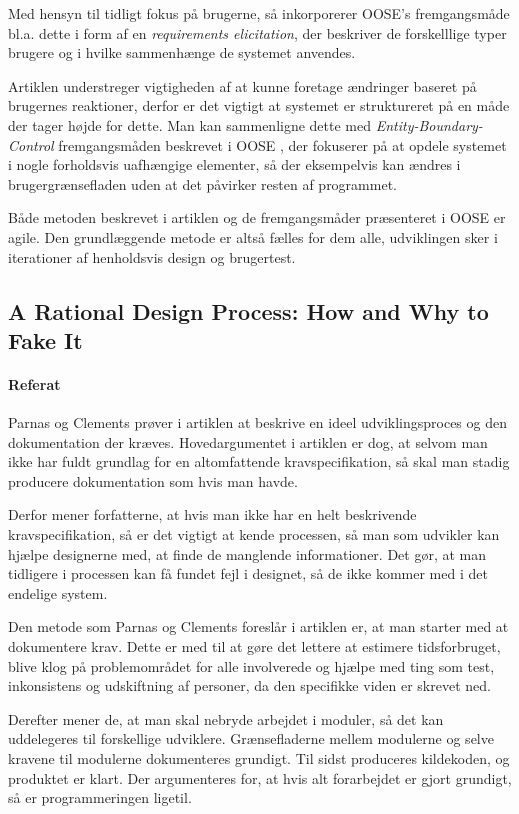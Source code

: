 \documentclass[11pt, a4paper]{article}
\begin{document}
Med hensyn til tidligt fokus på brugerne, så inkorporerer OOSE's fremgangsmåde bl.a. dette i form af en \emph{requirements elicitation}, der beskriver de forskelllige typer brugere og i hvilke sammenhænge de systemet anvendes.

Artiklen understreger vigtigheden af at kunne foretage ændringer baseret på brugernes reaktioner, derfor er det vigtigt at systemet er struktureret på en måde der tager højde for dette. Man kan sammenligne dette med \emph{Entity-Boundary-Control} fremgangsmåden beskrevet i OOSE \cite{OOSE}, der fokuserer på at opdele systemet i nogle forholdsvis uafhængige elementer, så der eksempelvis kan ændres i brugergrænsefladen uden at det påvirker resten af programmet.

Både metoden beskrevet i artiklen og de fremgangsmåder præsenteret i OOSE er agile. Den grundlæggende metode er altså fælles for dem alle, udviklingen sker i iterationer af henholdsvis design og brugertest.

\subsection{A Rational Design Process: How and Why to Fake It}
\label{sub:a_rational_design_process}
\paragraph{Referat}
Parnas og Clements \cite{parnas1986rational} prøver i artiklen at beskrive en ideel udviklingsproces og den dokumentation der kræves. Hovedargumentet i artiklen er dog, at selvom man ikke har fuldt grundlag for en altomfattende kravspecifikation, så skal man stadig producere dokumentation som hvis man havde.

Derfor mener forfatterne, at hvis man ikke har en helt beskrivende kravspecifikation, så er det vigtigt at kende processen, så man som udvikler kan hjælpe designerne med, at finde de manglende informationer. Det gør, at man tidligere i processen kan få fundet fejl i designet, så de ikke kommer med i det endelige system.

Den metode som Parnas og Clements foreslår i artiklen er, at man starter med at dokumentere krav. Dette er med til at gøre det lettere at estimere tidsforbruget, blive klog på problemområdet for alle involverede og hjælpe med ting som test, inkonsistens og udskiftning af personer, da den specifikke viden er skrevet ned.

Derefter mener de, at man skal nebryde arbejdet i moduler, så det kan uddelegeres til forskellige udviklere. Grænsefladerne mellem modulerne og selve kravene til modulerne dokumenteres grundigt. Til sidst produceres kildekoden, og produktet er klart. Der argumenteres for, at hvis alt forarbejdet er gjort grundigt, så er programmeringen ligetil.
\end{document}
